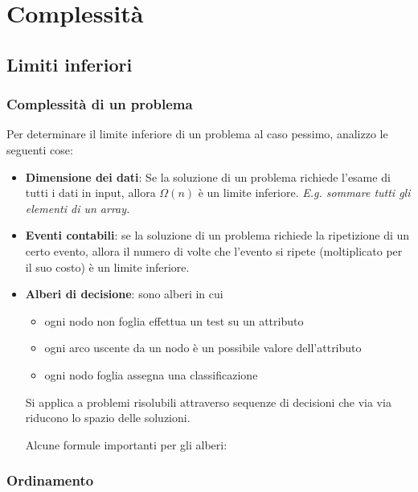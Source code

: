 \section{Complessità}
\subsection{Limiti inferiori}
\subsubsection{Complessità di un problema}
Per determinare il limite inferiore di un problema al caso pessimo, analizzo le seguenti cose:
\begin{itemize}
	\item \textbf{Dimensione dei dati}: Se la soluzione di un problema richiede l'esame di tutti i dati in input, allora $\Omega(n)$ è un limite inferiore. \emph{E.g. sommare tutti gli elementi di un array.}
	\item \textbf{Eventi contabili}: se la soluzione di un problema richiede la ripetizione di un certo evento, allora il numero di volte che l'evento si ripete (moltiplicato per il suo costo) è un limite inferiore.
	\item \textbf{Alberi di decisione}: sono alberi in cui
	\begin{itemize}
		\item ogni nodo non foglia effettua un test su un attributo
		\item ogni arco uscente da un nodo è un possibile valore dell'attributo
		\item ogni nodo foglia assegna una classificazione
	\end{itemize}
	Si applica a problemi risolubili attraverso sequenze di decisioni che via via riducono lo spazio delle soluzioni.
	\begin{note}
		Alcune formule importanti per gli alberi:
	\end{note}
\end{itemize}

\subsubsection{Ordinamento}
